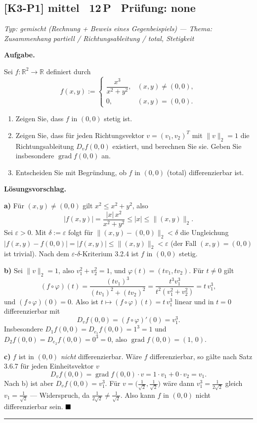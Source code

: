 \documentclass[a4paper,11pt]{article}
\providecommand{\qed}{\hfill\ensuremath{\blacksquare}}
\begin{document}
\subsection*{[K3-P1] \normalfont mittel \textbullet\ 12\,P \textbullet\ Pr\"ufung: none}
\textit{Typ: gemischt (Rechnung + Beweis eines Gegenbeispiels)  ---  Thema: Zusammenhang partiell / Richtungsableitung / total, Stetigkeit}\par\smallskip
\textbf{Aufgabe.}\par
Sei $f:\mathbb{R}^2\to\mathbb{R}$ definiert durch
\[
f(x,y):=\begin{cases}\dfrac{x^3}{x^2+y^2},&(x,y)\neq(0,0),\\[1ex]0,&(x,y)=(0,0).\end{cases}
\]
\begin{enumerate}[label=\alph*)]
\item Zeigen Sie, dass $f$ in $(0,0)$ stetig ist.
\item Zeigen Sie, dass f\"ur jeden Richtungsvektor $v=(v_1,v_2)^{T}$ mit $\|v\|_2=1$ die Richtungsableitung $D_v f(0,0)$ existiert, und berechnen Sie sie. Geben Sie insbesondere $\operatorname{grad} f(0,0)$ an.
\item Entscheiden Sie mit Begr\"undung, ob $f$ in $(0,0)$ (total) differenzierbar ist.
\end{enumerate}\par\smallskip
\textbf{L\"osungsvorschlag.}\par
\textbf{a)} F\"ur $(x,y)\neq(0,0)$ gilt $x^2\le x^2+y^2$, also
\[
|f(x,y)|=\frac{|x|\,x^2}{x^2+y^2}\le |x|\le \|(x,y)\|_2 .
\]
Sei $\varepsilon>0$. Mit $\delta:=\varepsilon$ folgt f\"ur $\|(x,y)-(0,0)\|_2<\delta$ die Ungleichung $|f(x,y)-f(0,0)|=|f(x,y)|\le\|(x,y)\|_2<\varepsilon$ (der Fall $(x,y)=(0,0)$ ist trivial). Nach dem $\varepsilon$-$\delta$-Kriterium 3.2.4 ist $f$ in $(0,0)$ stetig.

\textbf{b)} Sei $\|v\|_2=1$, also $v_1^2+v_2^2=1$, und $\varphi(t)=(tv_1,tv_2)$. F\"ur $t\neq0$ gilt
\[
(f\circ\varphi)(t)=\frac{(tv_1)^3}{(tv_1)^2+(tv_2)^2}=\frac{t^3v_1^3}{t^2(v_1^2+v_2^2)}=t\,v_1^3 ,
\]
und $(f\circ\varphi)(0)=0$. Also ist $t\mapsto (f\circ\varphi)(t)=t\,v_1^3$ linear und in $t=0$ differenzierbar mit
\[
D_v f(0,0)=(f\circ\varphi)'(0)=v_1^3 .
\]
Insbesondere $D_1 f(0,0)=D_{e_1}f(0,0)=1^3=1$ und $D_2 f(0,0)=D_{e_2}f(0,0)=0^3=0$, also $\operatorname{grad} f(0,0)=(1,\,0)$.

\textbf{c)} $f$ ist in $(0,0)$ \emph{nicht} differenzierbar. W\"are $f$ differenzierbar, so g\"alte nach Satz 3.6.7 f\"ur jeden Einheitsvektor $v$
\[
D_v f(0,0)=\operatorname{grad} f(0,0)\cdot v = 1\cdot v_1 + 0\cdot v_2 = v_1 .
\]
Nach b) ist aber $D_v f(0,0)=v_1^3$. F\"ur $v=\bigl(\tfrac{1}{\sqrt2},\tfrac{1}{\sqrt2}\bigr)$ w\"are dann $v_1^3=\tfrac{1}{2\sqrt2}$ gleich $v_1=\tfrac{1}{\sqrt2}$ — Widerspruch, da $\tfrac{1}{2\sqrt2}\neq\tfrac{1}{\sqrt2}$. Also kann $f$ in $(0,0)$ nicht differenzierbar sein. $\qed$\par\bigskip\hrule\bigskip
\end{document}
